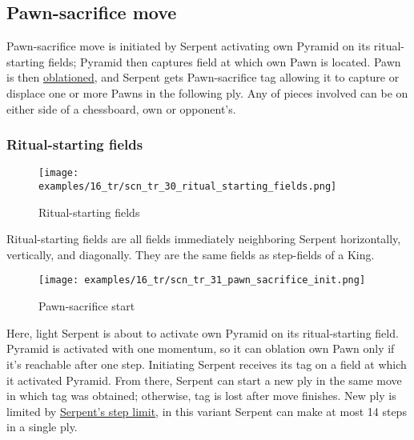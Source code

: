\subsection*{Pawn-sacrifice move}
\label{sec:Tamoanchan Revisited/Serpent/Pawn-sacrifice move}

Pawn-sacrifice move is initiated by Serpent activating own Pyramid on its
ritual-starting fields; Pyramid then captures field at which own Pawn is
located. Pawn is then \hyperref[sec:Terms/Oblation]{oblationed}, and Serpent
gets Pawn-sacrifice tag allowing it to capture or displace one or more Pawns
in the following ply. Any of pieces involved can be on either side of a
chessboard, own or opponent's.

\subsubsection*{Ritual-starting fields}
\label{sec:Tamoanchan Revisited/Serpent/Pawn-sacrifice move/Ritual-starting fields}

\vspace*{-0.9\baselineskip}
\noindent
\begin{wrapfigure}[5]{l}{0.4\textwidth}
\centering
\texttt{[image: examples/16\_tr/scn\_tr\_30\_ritual\_starting\_fields.png]}
\vspace*{-0.4\baselineskip}
\caption{Ritual-starting fields}
\label{fig:scn_tr_30_ritual_starting_fields}
\end{wrapfigure}
Ritual-starting fields are all fields immediately neighboring Serpent horizontally,
vertically, and diagonally. They are the same fields as step-fields of a King.


\clearpage %

\vspace*{-1.7\baselineskip}
\noindent
\begin{wrapfigure}[16]{l}{0.4\textwidth}
\centering
\texttt{[image: examples/16\_tr/scn\_tr\_31\_pawn\_sacrifice\_init.png]}
\vspace*{-0.4\baselineskip}
\caption{Pawn-sacrifice start}
\label{fig:scn_tr_31_pawn_sacrifice_init}
\end{wrapfigure}
Here, light Serpent is about to activate own Pyramid on its ritual-starting field.
Pyramid is activated with one momentum, so it can oblation own Pawn only if it's
reachable after one step.\newline
\indent
Initiating Serpent receives its tag on a field at which it activated Pyramid.
From there, Serpent can start a new ply in the same move in which tag was obtained;
otherwise, tag is lost after move finishes. New ply is limited by
\hyperref[fig:scn_tr_15_serpent_step_limit]{Serpent's step limit}, in this variant
Serpent can make at most 14 steps in a single ply.

